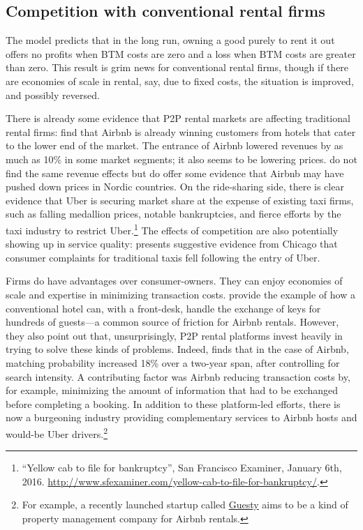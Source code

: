 \documentclass[12pt]{article}
\begin{document}
\subsection{Competition with conventional rental firms}
The model predicts that in the long run, owning a good purely to rent it out offers no profits when BTM costs are zero and a loss when BTM costs are greater than zero.
This result is grim news for conventional rental firms, though if there are economies of scale in rental, say, due to fixed costs, the situation is improved, and possibly reversed.

There is already some evidence that P2P rental markets are affecting traditional rental firms: 
\cite{byers2013rise} find that Airbnb is already winning customers from hotels that cater to the lower end of the market.
The entrance of Airbnb lowered revenues by as much as 10\% in some market segments;
it also seems to be lowering prices. 
\cite{neeser2015does} do not find the same revenue effects but do offer some evidence that Airbnb may have pushed down prices in Nordic countries.
On the ride-sharing side, there is clear evidence that Uber is securing market share at the expense of existing taxi firms, such as falling medallion prices, notable bankruptcies, and fierce efforts by the taxi industry to restrict Uber.\footnote{
  ``Yellow cab to file for bankruptcy'', San Francisco Examiner, January 6th, 2016. \href{http://www.sfexaminer.com/yellow-cab-to-file-for-bankruptcy/}{http://www.sfexaminer.com/yellow-cab-to-file-for-bankruptcy/}.
}
The effects of competition are also potentially showing up in service quality:
\cite{wallsten2015} presents suggestive evidence from Chicago that consumer complaints for traditional taxis fell following the entry of Uber. 

Firms do have advantages over consumer-owners.
They can enjoy economies of scale and expertise in minimizing transaction costs.
\cite{edelman2015efficiencies} provide the example of how a conventional hotel can, with a front-desk, handle the exchange of keys for hundreds of guests---a common source of friction for Airbnb rentals.
However, they also point out that, unsurprisingly, P2P rental platforms invest heavily in trying to solve these kinds of problems. 
Indeed, \cite{fradkin2012online} finds that in the case of Airbnb, matching probability increased 18\% over a two-year span, after controlling for search intensity.
A contributing factor was Airbnb reducing transaction costs by, for example, minimizing the amount of information that had to be exchanged before completing a booking.
In addition to these platform-led efforts, there is now a burgeoning industry providing complementary services to Airbnb hosts and would-be Uber drivers.\footnote{  
 For example, a recently launched startup called \href{https://www.guesty.com/}{Guesty} aims to be a kind of property management company for Airbnb rentals.
}
\end{document}
